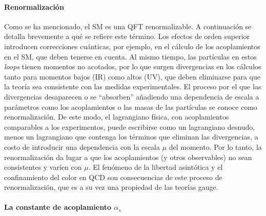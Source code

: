 \paragraph{Renormalizaci\'on}

Como se ha mencionado, el \ac{SM} es una \ac{QFT} renormalizable. A continuación se detalla brevemente a qué se refiere este término. Los efectos de orden superior introducen correcciones cuánticas, por ejemplo, en el cálculo de los acoplamientos en el \ac{SM}, que deben tenerse en cuenta. Al mismo tiempo, las partículas en estos \textit{loops} tienen momentos no acotados, por lo que surgen divergencias en los cálculos tanto para momentos bajos (\ac{IR}) como altos (\ac{UV}), que deben eliminarse para que la teoría sea consistente con las medidas experimentales. El proceso por el que las divergencias desaparecen o se \enquote{absorben} añadiendo una dependencia de escala a parámetros como los acoplamientos o las masas de las partículas se conoce como renormalización. De este modo, el lagrangiano física, con acoplamientos comparables a los experimentos, puede escribirse como un lagrangiano desnudo, menos un lagrangiano que contenga los términos que eliminan las divergencias, a costo de introducir una dependencia con la escala \(\mu\) del momento. Por lo tanto, la renormalización da lugar a que los acoplamientos (y otros observables) no sean consistentes y varíen con \(\mu\). El fenómeno de la libertad asintótica y el confinamiento del color en \ac{QCD} son consecuencias de este proceso de renormalización, que es a su vez una propiedad de las teorías gauge.

\paragraph{La constante de acoplamiento \(\alpha_s\)}

